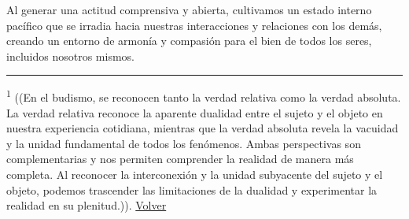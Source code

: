 \documentclass[
  a5paperpaper,
]{article}
\begin{document}
Al generar una actitud comprensiva y abierta, cultivamos un estado
interno pacífico que se irradia hacia nuestras interacciones y
relaciones con los demás, creando un entorno de armonía y compasión para
el bien de todos los seres, incluidos nosotros mismos.

\hfill\break

\begin{center}\rule{0.5\linewidth}{0.5pt}\end{center}

\leavevmode{}%
\textsuperscript{1} ((En el budismo, se reconocen tanto la verdad
relativa como la verdad absoluta. La verdad relativa reconoce la
aparente dualidad entre el sujeto y el objeto en nuestra experiencia
cotidiana, mientras que la verdad absoluta revela la vacuidad y la
unidad fundamental de todos los fenómenos. Ambas perspectivas son
complementarias y nos permiten comprender la realidad de manera más
completa. Al reconocer la interconexión y la unidad subyacente del
sujeto y el objeto, podemos trascender las limitaciones de la dualidad y
experimentar la realidad en su plenitud.)).
\protect\hyperlink{ref1}{Volver}

\hfill\break
\end{document}
